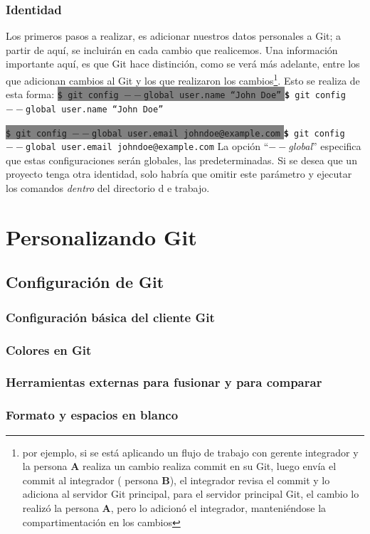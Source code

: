 \documentclass[12pt, spanish, oneside, onecolumn, a4paper]{report}
\newcommand{\shellcmd}[1]{ %
  \colorbox{Gray}{
    \indent\indent\texttt{\footnotesize\$ #1}
  }
  \colorbox{mygray}{
    \indent\indent\texttt{\textbf{\footnotesize\$} #1}
  }
}
\begin{document}
\subsection{Identidad} 
\label{sec:youridentity} Los primeros pasos a realizar, es adicionar nuestros datos personales a Git; a partir de aquí, se incluirán en cada cambio que realicemos. Una información importante aquí, es que Git hace distinción, como se verá más adelante, entre los que adicionan cambios al Git y los que realizaron los cambios\footnote{por ejemplo, si se está aplicando un flujo de trabajo con gerente integrador y la persona 
  \textbf{A} realiza un cambio realiza commit en su Git, luego envía el commit al integrador ( persona 
  \textbf{B}), el integrador revisa el commit y lo adiciona al servidor Git principal, para el servidor principal Git, el cambio lo realizó la persona 
  \textbf{A}, pero lo adicionó el integrador, manteniéndose la compartimentación en los cambios}. Esto se realiza de esta forma: 
\shellcmd{git config $--$global user.name ``John Doe''} 
\shellcmd{git config $--$global user.email johndoe@example.com} La opción ``\emph{$--$global}'' especifica que estas configuraciones serán globales, las predeterminadas. Si se desea que un proyecto tenga otra identidad, solo habría que omitir este parámetro y ejecutar los comandos 
\emph{dentro} del directorio d e trabajo. 
\chapter{Personalizando Git} 
\label{chap:customizinggit} 
\section{Configuración de Git} 
\label{sec:configuringgit} 
\subsection{Configuración básica del cliente Git} 
\label{sec:basicconf} 
\subsection{Colores en Git} 
\label{sec:colors} 
\subsection{Herramientas externas para fusionar y para comparar} 
\label{sec:externaltools} 
\subsection{Formato y espacios en blanco} 
\label{sec:formatsandspaces} 
\end{document}
